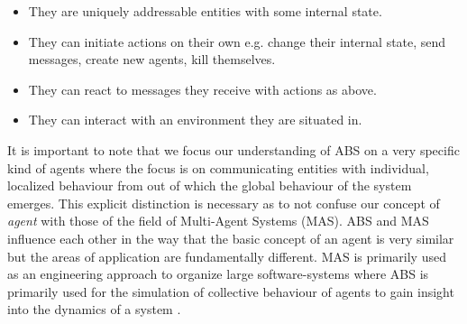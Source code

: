 \begin{itemize}
	\item They are uniquely addressable entities with some internal state.
	\item They can initiate actions on their own e.g. change their internal state, send messages, create new agents, kill themselves.
	\item They can react to messages they receive with actions as above.
	\item They can interact with an environment they are situated in.
\end{itemize} 

It is important to note that we focus our understanding of ABS on a very specific kind of agents where the focus is on communicating entities with individual, localized behaviour from out of which the global behaviour of the system emerges. This explicit distinction is necessary as to not confuse our concept of \textit{agent} with those of the field of Multi-Agent Systems (MAS). ABS and MAS influence each other in the way that the basic concept of an agent is very similar but the areas of application are fundamentally different. MAS is primarily used as an engineering approach to organize large software-systems \cite{weiss_multiagent_2013} where ABS is primarily used for the simulation of collective behaviour of agents to gain insight into the dynamics of a system \cite{dawson_opening_2014}.

